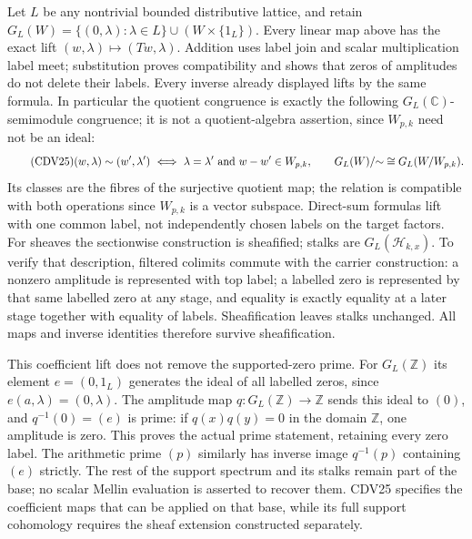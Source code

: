 Let $L$ be any nontrivial bounded distributive lattice, and retain
$G_L(W)=\{(0,\lambda):\lambda\in L\}\cup(W\times\{1_L\})$.
Every linear map above has the exact lift
$(w,\lambda)\mapsto(Tw,\lambda)$. Addition uses label join and
scalar multiplication label meet; substitution proves compatibility
and shows that zeros of amplitudes do not delete their labels.
Every inverse already displayed lifts by the same formula.
In particular the quotient congruence is exactly
the following $G_L(\mathbb C)$-semimodule congruence; it is not
a quotient-algebra assertion, since $W_{p,k}$ need not be an ideal:
\begin{equation}\tag{CDV25}
 (w,\lambda)\sim(w',\lambda')
 \ \Longleftrightarrow\ \lambda=\lambda'\ \hbox{and}\ w-w'\in W_{p,k},
 \qquad G_L(W)/{\sim}\cong G_L(W/W_{p,k}).
\end{equation}
Its classes are the fibres of the surjective quotient map;
the relation is compatible with both operations since $W_{p,k}$
is a vector subspace. Direct-sum formulas lift with one common
label, not independently chosen labels on the target factors.
For sheaves the sectionwise construction is sheafified; stalks are
$G_L(\mathcal H_{k,x})$. To verify that description, filtered
colimits commute with the carrier construction: a nonzero amplitude
is represented with top label; a labelled zero is represented by
that same labelled zero at any stage, and equality is exactly
equality at a later stage together with equality of labels.
Sheafification leaves stalks unchanged. All maps and inverse
identities therefore survive sheafification.

This coefficient lift does not remove the supported-zero prime.
For $G_L(\mathbb Z)$ its element $e=(0,1_L)$ generates the ideal
of all labelled zeros, since $e(a,\lambda)=(0,\lambda)$.
The amplitude map $q:G_L(\mathbb Z)\to\mathbb Z$ sends this
ideal to $(0)$, and $q^{-1}(0)=(e)$ is prime: if $q(x)q(y)=0$
in the domain $\mathbb Z$, one amplitude is zero. This proves
the actual prime statement, retaining every zero label. The
arithmetic prime $(p)$ similarly has inverse image $q^{-1}(p)$
containing $(e)$ strictly. The rest of the support spectrum and
its stalks remain part of the base; no scalar Mellin evaluation
is asserted to recover them. CDV25 specifies the coefficient
maps that can be applied on that base, while its full support
cohomology requires the sheaf extension constructed separately.
